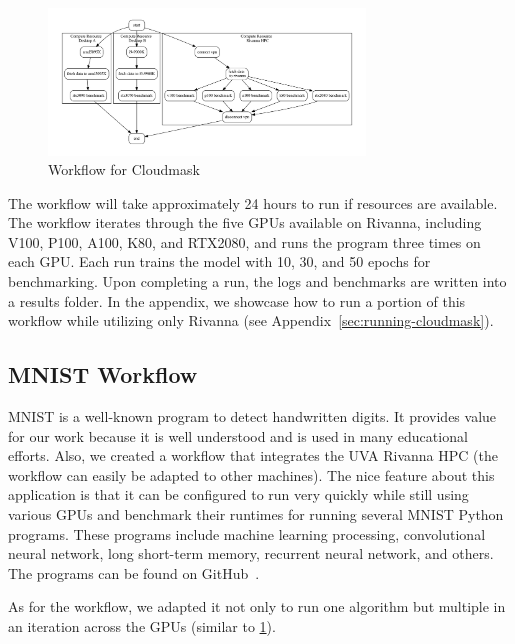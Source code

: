 \documentclass[sigplan,screen]{acmart}
\newcommand{\FILE}[1]{}
\begin{document}
\begin{figure}[htb]
\centering
\includegraphics[width=0.75\textwidth]{images/cloudmask-wf.pdf}
\caption{Workflow for Cloudmask}\label{fig:cloudmaskwf}
\end{figure}

The workflow will take approximately 24 hours to run if resources are
available. The workflow iterates through the five GPUs available on
Rivanna, including V100, P100, A100, K80, and RTX2080, and runs the
program three times on each GPU. Each run trains the model with 10,
30, and 50 epochs for benchmarking. Upon completing a run, the logs
and benchmarks are written into a results folder. In the appendix, we
showcase how to run a portion of this workflow while utilizing
only Rivanna (see Appendix~\ref{sec:running-cloudmask}).



%

\FILE{mnist.tex}

\subsection{MNIST Workflow}\label{mnist-workflow}

MNIST is a well-known program to detect handwritten digits. It
provides value for our work because it is well understood and is used
in many educational efforts. Also, we created a workflow that
integrates the UVA Rivanna HPC (the workflow can easily be adapted to other
machines). The nice feature about this application is that it can be
configured to run very quickly while still using various GPUs and
benchmark their runtimes for running several MNIST Python
programs. These programs include machine learning processing,
convolutional neural network, long short-term memory, recurrent neural
network, and others. The programs can be found on
GitHub~\cite{www-mnist-programs}.

As for the workflow, we adapted it not only to run one algorithm but
multiple in an iteration across the GPUs (similar to
\ref{fig:cloudmaskwf}).
\end{document}
